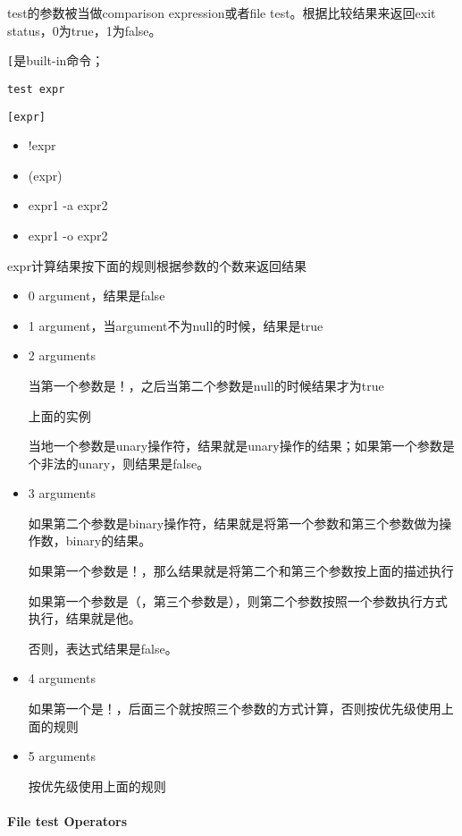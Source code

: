 test的参数被当做comparison expression或者file test。根据比较结果来返回exit status，0为true，1为false。

\lstinline$[$是built-in命令；

\lstinline$test expr$

\lstinline$[expr]$

\begin{itemize}
\item !expr
\item (expr)
\item expr1 -a expr2
\item expr1 -o expr2 
\end{itemize}

expr计算结果按下面的规则根据参数的个数来返回结果
\begin{itemize}
\item 0 argument，结果是false
\item 1 argument，当argument不为null的时候，结果是true
\item 2 arguments

当第一个参数是！，之后当第二个参数是null的时候结果才为true

\begin{Command-Line}

上面的实例

\end{Command-Line}

当地一个参数是unary操作符，结果就是unary操作的结果；如果第一个参数是个非法的unary，则结果是false。


\item 3 arguments 

如果第二个参数是binary操作符，结果就是将第一个参数和第三个参数做为操作数，binary的结果。

如果第一个参数是！，那么结果就是将第二个和第三个参数按上面的描述执行

如果第一个参数是（，第三个参数是），则第二个参数按照一个参数执行方式执行，结果就是他。

否则，表达式结果是false。

\item 4 arguments

如果第一个是！，后面三个就按照三个参数的方式计算，否则按优先级使用上面的规则

\item 5 arguments

按优先级使用上面的规则

\end{itemize} 


\paragraph{File test Operators}

